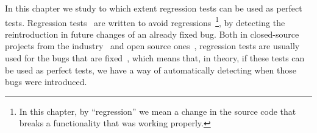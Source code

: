 In this chapter we study to which extent regression tests can be used as perfect tests. 
Regression tests~\cite{desikan2006softwareRegressionTesting,wahl1999overview} are written to avoid regressions~\footnote{In this chapter, by ``regression'' we mean a change in the source code that breaks a functionality that was working properly.}, by detecting the reintroduction in future changes of an already fixed bug. 
Both in closed-source projects from the industry~\cite{ali2019search,onoma1998regression,engstrom2010qualitative} and open source ones~\cite{schmidt2001leveraging}, 
regression tests are usually used for the bugs that are fixed~\cite{perscheid2017studying}, which means that, in theory, if these tests can be used as perfect tests, we have a way of automatically detecting when those bugs were introduced.

